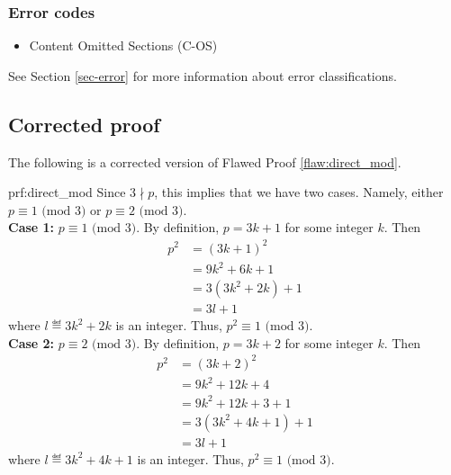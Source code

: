  
\subsubsection{Error codes}
\begin{itemize}
	\item 	Content Omitted Sections (C-OS)
\end{itemize}
See Section \ref{sec-error} for more information about error classifications.

\clearpage
\subsection{Corrected proof}

The following is a corrected version of Flawed Proof \ref{flaw:direct_mod}.

\begin{prf}{prf:direct_mod}
Since $3 \nmid p$, this implies that we have two cases. Namely, either \\
$p \equiv 1 \text{ (mod } 3)$ or $p \equiv 2 \text{ (mod } 3)$. \\ 

\noindent \textbf{Case 1:} $p \equiv 1 \text{ (mod } 3)$. By definition, $p = 3k+1$ for some integer $k.$ Then
\begin{align*}
    p^2 &= (3k+1)^2 \\
    &= 9k^2 + 6k +1 \\
    & = 3(3k^2+2k)+1 \\
    & = 3l + 1
\end{align*}
where $l \eqdef 3k^2+2k$ is an integer. Thus, $p^2 \equiv 1 \text{ (mod } 3).$ \\

\noindent \textbf{Case 2:} $p \equiv 2 \text{ (mod } 3)$. By definition, $p = 3k+2$ for some integer $k.$ Then
\begin{align*}
    p^2 &= (3k+2)^2 \\
    &= 9k^2 + 12k +4 \\
    &= 9k^2 + 12k +3 + 1 \\
    & = 3(3k^2+4k+1)+1 \\
    & = 3l + 1
\end{align*}
where $l \eqdef 3k^2+4k+1$ is an integer. Thus, $p^2 \equiv 1 \text{ (mod } 3).$

\end{prf}
